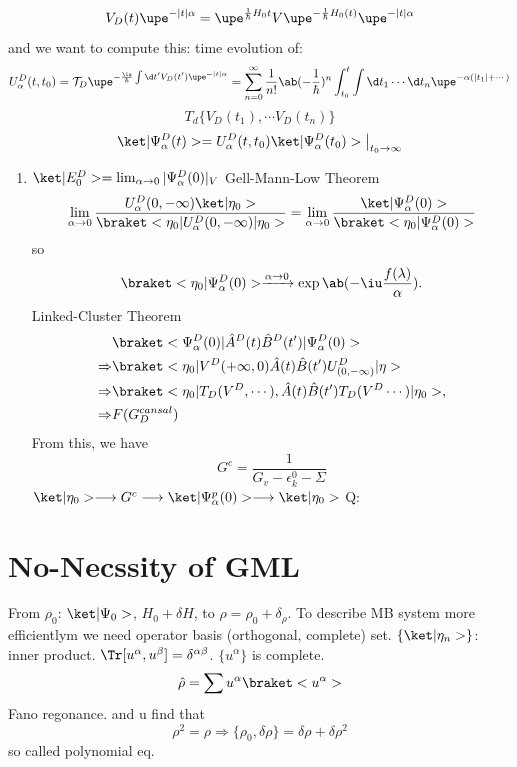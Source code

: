 \[
  V_D(t) \upe^{-|t|\alpha} = \upe^{\frac1\hbar H_0t} V \upe^{-\frac1\hbar H_0(t)} \upe^{-|t|\alpha}
\]
and we want to compute this: time evolution of:
\begin{equation}
  U_\alpha^D(t,t_0) = \mathcal T_D \upe^{-\frac\iu\hbar \int \d t' V_D(t') \upe^{-|t| \alpha}}
= \sum_{n = 0}^\infty \frac1{n!} \ab(-\frac1\hbar)^n \int_{t_0}^t \int \d t_1 \cdots \d t_n \upe^{-\alpha(|t_1| + \cdots)}
\end{equation}
\[
  T_d \{V_D(t_1), \cdots V_D(t_n)\}
\]
\[
  \ket|\Psi_\alpha^D(t)> = U_\alpha^D (t,t_0) \ket|\Psi_\alpha^D(t_0)> \big|_{t_0 \to \infty}
\]
\begin{enumerate}
  \item $\ket|E_0^D> = \lim_{\alpha\to 0} |\Psi_\alpha^D (0)|_V $ Gell-Mann-Low Theorem
  \[
    \lim_{\alpha \to 0}
    \frac{U_\alpha^D(0,-\infty) \ket|\eta_0>}
      {\braket<\eta_0|U_\alpha^D (0,-\infty)|\eta_0>}
    = \lim_{\alpha\to0}
    \frac{\ket|\Psi_\alpha^D(0)>}{\braket<\eta_0|\Psi_\alpha^D(0)>}
  \]
  so
  \[
    \braket<\eta_0|\Psi_\alpha^D(0)> \xrightarrow{\alpha \to 0}
    \exp\ab(-\iu\frac{f(\lambda)}{\alpha}).
  \]
  Linked-Cluster Theorem
  \begin{align*}
    & \braket<\Psi_\alpha^D(0)| \hat A^D(t)  \hat B^D(t') |\Psi_\alpha^D(0)>\\
  \Rightarrow & \braket<\eta_0|V^D(+\infty,0) \hat A(t) \hat B(t') U_{(0,-\infty)}^D|\eta>\\
  \Rightarrow & \braket<\eta_0|T_D(V^D,\cdots), \hat A(t)\hat B(t')T_D(V^D\cdots)|\eta_0>,\\
  \Rightarrow & F(G_D^{cansal})
  \end{align*}
  From this, we have
  \[
    G^c = \frac{1}{G_v - \epsilon_k^0 - \Sigma}
  \]
  $\ket|\eta_0> \longrightarrow G^c \longrightarrow \ket|\Psi_\alpha^p(0)> \longrightarrow \ket|\eta_0>$ Q:
\end{enumerate}

\section{No-Necssity of GML}

From $\rho_0$: $\ket|\Psi_0>$, $H_0 + \delta H$, to
$\rho = \rho_0 + \delta_\rho$.
To describe MB system more efficientlym we need operator basis (orthogonal, complete) set.
$\{\ket|\eta_n>\}$: inner product. $\Tr[u^\alpha, u^\beta] = \delta^{\alpha\beta}$. $\{u^\alpha\}$ is complete.
\[\hat \rho = \sum u^\alpha \braket<u^\alpha>\]
Fano regonance.
and u find that
\[
  \rho^2 = \rho \Rightarrow \{\rho_0, \delta\rho\} = \delta\rho + \delta\rho^2
\]
so called polynomial eq.

